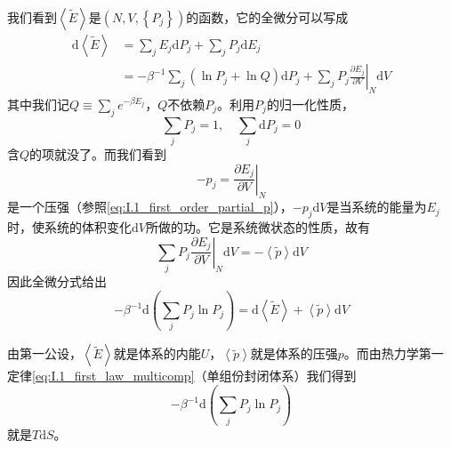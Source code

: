 \documentclass[main.tex]{subfiles}
\begin{document}
我们看到$\left\langle\tilde{E}\right\rangle$是$\left(N,V,\left\{P_j\right\}\right)$的函数，它的全微分可以写成
\begin{align*}
    \mathrm{d}\left\langle\tilde{E}\right\rangle & =\sum_jE_j\mathrm{d}P_j+\sum_jP_j\mathrm{d}E_j                                                                                 \\
                                                 & =-\beta^{-1}\sum_j\left(\ln P_j+\ln Q\right)\mathrm{d}P_j+\sum_jP_j\left.\frac{\partial E_j}{\partial V}\right|_{N}\mathrm{d}V
\end{align*}
其中我们记$Q\equiv\sum_je^{-\beta E_j}$，$Q$不依赖$P_j$。利用$P_j$的归一化性质，
\[\sum_jP_j=1,\quad\sum_j\mathrm{d}P_j=0\]
含$Q$的项就没了。而我们看到
\[-p_j=\left.\frac{\partial E_j}{\partial V}\right|_{N}\]
是一个压强（参照\eqref{eq:I.1_first_order_partial_p}），$-p_j\mathrm{d}V$是当系统的能量为$E_j$时，使系统的体积变化$\mathrm{d}V$所做的功。它是系统微状态的性质，故有
\[\sum_jP_j\left.\frac{\partial E_j}{\partial V}\right|_{N}\mathrm{d}V=-\left\langle\tilde{p}\right\rangle\mathrm{d}V\]
因此全微分式给出
\[-\beta^{-1}\mathrm{d}\left(\sum_jP_j\ln P_j\right)=\mathrm{d}\left\langle\tilde{E}\right\rangle+\left\langle\tilde{p}\right\rangle\mathrm{d}V\]

由第一公设，$\left\langle\tilde{E}\right\rangle$就是体系的内能$U$，$\left\langle\tilde{p}\right\rangle$就是体系的压强$p$。而由热力学第一定律\eqref{eq:I.1_first_law_multicomp}（单组份封闭体系）我们得到
\[-\beta^{-1}\mathrm{d}\left(\sum_jP_j\ln P_j\right)\]
就是$T\mathrm{d}S$。
\end{document}

